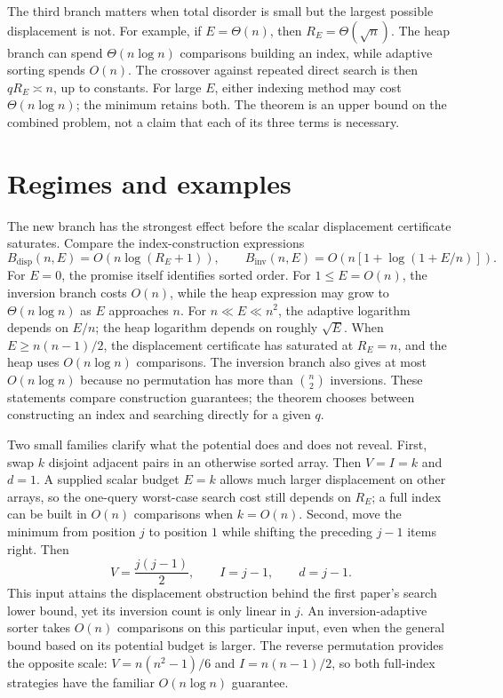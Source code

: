 \documentclass[10pt,letterpaper]{article}
\begin{document}
The third branch matters when total disorder is small but the largest
possible displacement is not. For example, if $E=\Theta(n)$, then
$R_E=\Theta(\sqrt n)$. The heap branch can spend
$\Theta(n\log n)$ comparisons building an index, while adaptive
sorting spends $O(n)$. The crossover against repeated direct search
is then $qR_E\asymp n$, up to constants. For large $E$, either
indexing method may cost $\Theta(n\log n)$; the minimum retains both.
The theorem is an upper bound on the combined problem, not a claim
that each of its three terms is necessary.

\section{Regimes and examples}
The new branch has the strongest effect before the scalar displacement
certificate saturates. Compare the index-construction expressions
\[
 B_{\mathrm{disp}}(n,E)=O(n\log(R_E+1)),\qquad
 B_{\mathrm{inv}}(n,E)=O\!\left(n\left[1+\log(1+E/n)\right]\right).
\]
For $E=0$, the promise itself identifies sorted order. For
$1\le E=O(n)$, the inversion branch costs $O(n)$, while the
heap expression may grow to $\Theta(n\log n)$ as $E$ approaches $n$.
For $n\ll E\ll n^2$, the adaptive logarithm depends on $E/n$;
the heap logarithm depends on roughly $\sqrt E$. When
$E\ge n(n-1)/2$, the displacement certificate has saturated at
$R_E=n$, and the heap uses $O(n\log n)$ comparisons. The
inversion branch also gives at most $O(n\log n)$ because no
permutation has more than $\binom n2$ inversions. These statements
compare construction guarantees; the theorem chooses between
constructing an index and searching directly for a given $q$.

Two small families clarify what the potential does and does not reveal.
First, swap $k$ disjoint adjacent pairs in an otherwise sorted array.
Then $V=I=k$ and $d=1$. A supplied scalar budget $E=k$ allows much
larger displacement on other arrays, so the one-query worst-case
search cost still depends on $R_E$; a full index can be built in
$O(n)$ comparisons when $k=O(n)$. Second, move the minimum from
position $j$ to position $1$ while shifting the preceding $j-1$
items right. Then
\[
 V=\frac{j(j-1)}2,\qquad I=j-1,\qquad d=j-1.
\]
This input attains the displacement obstruction behind the first
paper's search lower bound, yet its inversion count is only linear
in $j$. An inversion-adaptive sorter takes $O(n)$ comparisons on
this particular input, even when the general bound based on its
potential budget is larger. The reverse permutation provides the
opposite scale: $V=n(n^2-1)/6$ and $I=n(n-1)/2$, so both full-index
strategies have the familiar $O(n\log n)$ guarantee.
\end{document}
